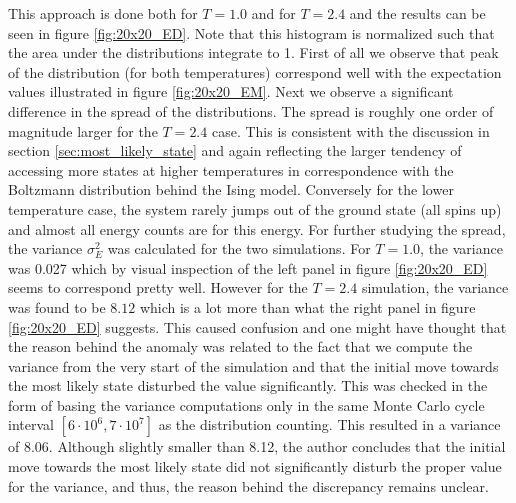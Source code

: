 \documentclass[12pt]{article}
\numberwithin{figure}{section}
\numberwithin{table}{section}
\begin{document}
\noindent This approach is done both for $T=1.0$ and for $T=2.4$ and the results can be seen in figure \ref{fig:20x20_ED}. Note that this histogram is normalized such that the area under the distributions integrate to 1. First of all we observe that peak of the distribution (for both temperatures) correspond well with the expectation values illustrated in figure \ref{fig:20x20_EM}. Next we observe a significant difference in the spread of the distributions. The spread is roughly one order of magnitude larger for the $T=2.4$ case. This is consistent with the discussion in section \ref{sec:most_likely_state} and again reflecting the larger tendency of accessing more states at higher temperatures in correspondence with the Boltzmann distribution behind the Ising model. Conversely for the lower temperature case, the system rarely jumps out of the ground state (all spins up) and almost all energy counts are for this energy. For further studying the spread, the variance $\sigma_E^2$ was calculated for the two simulations. For $T=1.0$, the variance was 0.027 which by visual inspection of the left panel in figure \ref{fig:20x20_ED} seems to correspond pretty well. However for the $T=2.4$ simulation, the variance was found to be $8.12$ which is a lot more than what the right panel in figure \ref{fig:20x20_ED} suggests. This caused confusion and one might have thought that the reason behind the anomaly was related to the fact that we compute the variance from the very start of the simulation and that the initial move towards the most likely state disturbed the value significantly. This was checked in the form of basing the variance computations only in the same Monte Carlo cycle interval $[6\cdot10^6,7\cdot10^7]$ as the distribution counting. This resulted in a variance of 8.06. Although slightly smaller than 8.12, the author concludes that the initial move towards the most likely state did not significantly disturb the proper value for the variance, and thus, the reason behind the discrepancy remains unclear.


\end{document}
